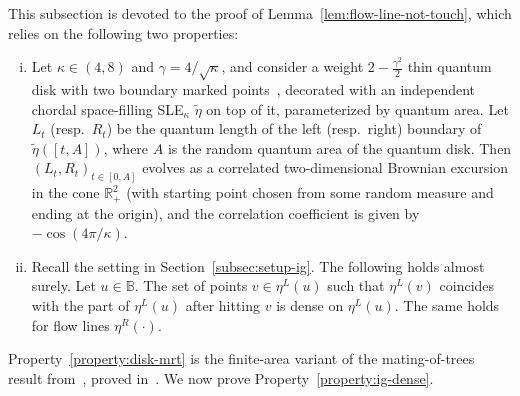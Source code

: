 \documentclass[a4paper]{article}
\numberwithin{equation}{section}
\numberwithin{equation}{section}
\renewcommand{\1}{\mathbf{1}}
\begin{document}
This subsection is devoted to the proof of Lemma~\ref{lem:flow-line-not-touch}, which relies on the following two properties:
\begin{enumerate}[(i)]
    \item \label{property:disk-mrt} Let $\kappa \in (4,8)$ and $\gamma=4/\sqrt{\kappa}$, and consider a weight $2-\frac{\gamma^2}{2}$ thin quantum disk with two boundary marked points~\cite{AHS20}, decorated with an independent chordal space-filling SLE$_\kappa$ $\widetilde \eta$ on top of it, parameterized by quantum area. Let $L_t$ (resp.\ $R_t$) be the quantum length of the left (resp.\ right) boundary of $\widetilde \eta([t,A])$, where $A$ is the random quantum area of the quantum disk. Then $(L_t,R_t)_{t \in [0,A]}$ evolves as a correlated two-dimensional Brownian excursion in the cone $\mathbb R_+^2$ (with starting point chosen from some random measure and ending at the origin), and the correlation coefficient is given by $-\cos(4\pi/\kappa)$.

    \item \label{property:ig-dense} Recall the setting in Section~\ref{subsec:setup-ig}. The following holds almost surely. Let $u \in \mathbb{B}$. The set of points $v \in \eta^L(u)$ such that $\eta^L(v)$ coincides with the part of $\eta^L(u)$ after hitting $v$ is dense on $\eta^L(u)$. The same holds for flow lines $\eta^R(\cdot)$.
\end{enumerate}

Property~\eqref{property:disk-mrt} is the finite-area variant of the mating-of-trees result from~\cite[Theorem 1.9]{DMS21-LQG-MRT}, proved in~\cite[Corollary 7.4]{AHS20}. We now prove Property~\eqref{property:ig-dense}.
\end{document}
